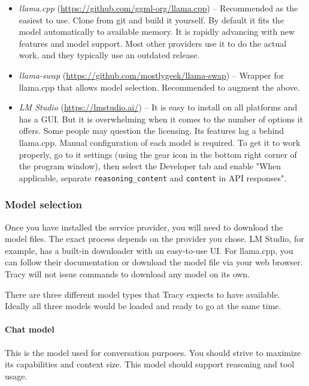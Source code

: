 \documentclass[hidelinks,titlepage,a4paper,twoside]{article}
\begin{document}
\begin{itemize}
\item \emph{llama.cpp} (\url{https://github.com/ggml-org/llama.cpp}) -- Recommended as the easiest to use. Clone from git and build it yourself. By default it fits the model automatically to available memory. It is rapidly advancing with new features and model support. Most other providers use it to do the actual work, and they typically use an outdated release.
\item \emph{llama-swap} (\url{https://github.com/mostlygeek/llama-swap}) -- Wrapper for llama.cpp that allows model selection. Recommended to augment the above.
\item \emph{LM Studio} (\url{https://lmstudio.ai/}) -- It is easy to install on all platforms and has a GUI. But it is overwhelming when it comes to the number of options it offers. Some people may question the licensing. Its features lag a behind llama.cpp. Manual configuration of each model is required. To get it to work properly, go to it settings (using the gear icon in the bottom right corner of the program window), then select the Developer tab and enable "When applicable, separate \texttt{reasoning\_content} and \texttt{content} in API responses".
\end{itemize}

\subsubsection{Model selection}

Once you have installed the service provider, you will need to download the model files. The exact process depends on the provider you chose. LM Studio, for example, has a built-in downloader with an easy-to-use UI. For llama.cpp, you can follow their documentation or download the model file via your web browser. Tracy will not issue commands to download any model on its own.

There are three different model types that Tracy expects to have available. Ideally all three models would be loaded and ready to go at the same time.

\paragraph{Chat model}

This is the model used for conversation purposes. You should strive to maximize its capabilities and context size. This model should support reasoning and tool usage.
\end{document}

